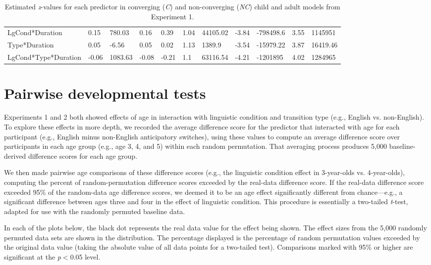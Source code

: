 \documentclass[authoryear, 12pt]{elsarticle}
\begin{document}
\begin{table}
\begin{scriptsize}
\begin{tabular}{lllllllllll}
    LgCond*Duration			& 0.15	& 780.03	& 0.16	& 0.39	& 1.04	& 44105.02	& -3.84	& -798498.6	& 3.55	& 1145951	\\
    Type*Duration 				& 0.05	& -6.56		& 0.05	& 0.02	& 1.13	& 1389.9	& -3.54	& -15979.22	& 3.87	& 16419.46	\\
    LgCond*Type*Duration	& -0.06	& 1083.63	& -0.08	& -0.21	& 1.1		& 63116.54	& -4.21	& -1201895		& 4.02	& 1284965	\\
    \hline
  \end{tabular}
  \caption{Estimated \textit{z}-values for each predictor in converging (\textit{C}) and non-converging (\textit{NC}) child and adult models from Experiment 1. }
\label{tab:nonconv_e1}
 \end{scriptsize}
\end{table}

\section{Pairwise developmental tests}
\label{sec:pairwisedev}
\setcounter{figure}{0}
Experiments 1 and 2 both showed effects of age in interaction with linguistic condition and transition type (e.g., English vs. non-English). To explore these effects in more depth, we recorded the average difference score for the predictor that interacted with age for each participant (e.g., English minus non-English anticipatory switches), using these values to compute an average difference score over participants in each age group (e.g., age 3, 4, and 5) within each random permutation. That averaging process produces 5,000 baseline-derived difference scores for each age group.

We then made pairwise age comparisons of these difference scores (e.g., the linguistic condition effect in 3-year-olds vs. 4-year-olds), computing the percent of random-permutation difference scores exceeded by the real-data difference score. If the real-data difference score exceeded 95\% of the random-data age difference scores, we deemed it to be an age effect significantly different from chance---e.g., a significant difference between ages three and four in the effect of linguistic condition. This procedure is essentially a two-tailed \textit{t}-test, adapted for use with the randomly permuted baseline data.

In each of the plots below, the black dot represents the real data value for the effect being shown. The effect sizes from the 5,000 randomly permuted data sets are shown in the distribution. The percentage displayed is the percentage of random permutation values exceeded by the original data value (taking the absolute value of all data points for a two-tailed test). Comparisons marked with 95\% or higher are significant at the \textit{p}$<$0.05 level. 
\end{document}
